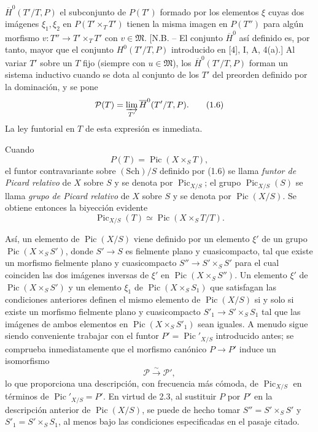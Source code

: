 $\overline H^0(T'/T,P)$ el subconjunto de $P(T')$ formado por los elementos
$\xi$ cuyas dos imágenes $\xi_1,\xi_2$ en $P(T'\times_TT')$ tienen la misma
imagen en $P(T'')$ para algún morfismo
$v:T''\longrightarrow T'\times_TT'$ con $v\in\mathfrak M$. [N.B. -- El
conjunto $\overline H^0$ así definido es, por tanto, mayor que el conjunto
$H^0(T'/T,P)$ introducido en [4], I, A, 4(a).] Al variar $T'$ sobre un $T$ fijo
(siempre con $u\in\mathfrak M$), los $\overline H^0(T'/T,P)$ forman un sistema
inductivo cuando se dota al conjunto de los $T'$ del preorden definido por la
dominación, y se pone
\begin{equation}
\mathcal P(T)=\varinjlim_{T'}\overline H^0(T'/T,P).
\tag{1.6}
\end{equation}
La ley funtorial en $T$ de esta expresión es inmediata.

Cuando
\[
P(T)=\operatorname{Pic}(X\times_ST),
\]
el funtor contravariante sobre $(\mathrm{Sch})/S$ definido por (1.6) se llama
\emph{funtor de Picard relativo} de $X$ sobre $S$ y se denota por
$\operatorname{Pic}_{X/S}$; el grupo $\operatorname{Pic}_{X/S}(S)$ se llama
\emph{grupo de Picard relativo} de $X$ sobre $S$ y se denota por
$\operatorname{Pic}(X/S)$. Se obtiene entonces la biyección evidente
\begin{equation}
\operatorname{Pic}_{X/S}(T)\simeq\operatorname{Pic}(X\times_ST/T).
\tag{1.7}
\end{equation}

Así, un elemento de $\operatorname{Pic}(X/S)$ viene definido por un elemento
$\xi'$ de un grupo $\operatorname{Pic}(X\times_SS')$, donde
$S'\longrightarrow S$ es fielmente plano y cuasicompacto, tal que existe un
morfismo fielmente plano y cuasicompacto
$S''\longrightarrow S'\times_SS'$ para el cual coinciden las dos imágenes
inversas de $\xi'$ en $\operatorname{Pic}(X\times_SS'')$. Un elemento $\xi'$ de
$\operatorname{Pic}(X\times_SS')$ y un elemento $\xi_1$ de
$\operatorname{Pic}(X\times_SS_1)$ que satisfagan las condiciones anteriores
definen el mismo elemento de $\operatorname{Pic}(X/S)$ si y solo si existe un
morfismo fielmente plano y cuasicompacto
$S'_1\longrightarrow S'\times_SS_1$ tal que las imágenes de ambos elementos en
$\operatorname{Pic}(X\times_SS'_1)$ sean iguales. A menudo sigue siendo
conveniente trabajar con el funtor $P'=\operatorname{Pic}'_{X/S}$ introducido
antes; se comprueba inmediatamente que el morfismo canónico
$P\longrightarrow P'$ induce un isomorfismo
\begin{equation}
\mathcal P\xrightarrow{\sim}\mathcal P',
\tag{1.8}
\end{equation}
lo que proporciona una descripción, con frecuencia más cómoda, de
$\operatorname{Pic}_{X/S}$ en términos de
$\operatorname{Pic}'_{X/S}=P'$. En virtud de 2.3, al sustituir $P$ por $P'$ en
la descripción anterior de $\operatorname{Pic}(X/S)$, se puede de hecho
tomar $S''=S'\times_SS'$ y $S'_1=S'\times_SS_1$, al menos bajo las condiciones
especificadas en el pasaje citado.

